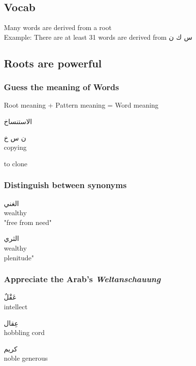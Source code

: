\subsection{Vocab}
Many words are derived from a root \\
Example: There are at least 31 words are derived from \textarabic{س ك ن}
\subsection{Roots are powerful}
\subsubsection{Guess the meaning of Words}

Root meaning + Pattern meaning = Word meaning \\

\begin{minipage}{.33\textwidth}
	\textarabic{الاستنساخ}
\end{minipage}
\begin{minipage}{.33\textwidth}
	\textarabic{ن س خ} \\ copying
\end{minipage}
\begin{minipage}{.33\textwidth}
	to clone
\end{minipage}

\subsubsection{Distinguish between synonyms}
\begin{minipage}{.5\textwidth}
	\textarabic{الغني} \\ wealthy \\ "free from need"
\end{minipage}
\begin{minipage}{.5\textwidth}
	\textarabic{الثري} \\ wealthy \\ plenitude"
\end{minipage}
	
\subsubsection{Appreciate the Arab's \textit{Weltanschauung}}

\begin{minipage}{.33\textwidth}
	\textarabic{عَقْلٌ} \\ intellect
\end{minipage}
\begin{minipage}{.33\textwidth}
	\textarabic{عِقال} \\ hobbling cord
\end{minipage}
\begin{minipage}{.33\textwidth}
	\textarabic{كريم} \\ noble generous
\end{minipage}


